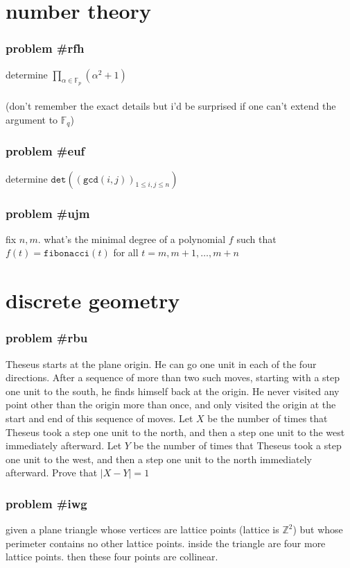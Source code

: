 \documentclass{article}
\newcommand{\problem}[1]{\subsubsection*{\textbf{problem \##1}}}
\newcommand{\chapter}[1]{\section*{#1}}
\newcommand{\Z}{\mathbb{Z}}
\newcommand{\F}{\mathbb{F}}
\newcommand{\FNC}[1]{\texttt{#1}}
\begin{document}
\chapter{number theory}
\problem{rfh} determine $\displaystyle{\prod_{\alpha\in\F_p}(\alpha^2+1)}$\\\\
(don't remember the exact details but i'd be surprised if one can't extend the argument to $\F_q$)
\problem{euf} determine $\FNC{det}((\FNC{gcd}(i,j))_{1\le i,j\le n})$
\problem{ujm} fix $n,m$. what's the minimal degree of a polynomial $f$ such that $f(t)=\FNC{fibonacci}(t)$ for all $t=m,m+1,\dots,m+n$
\chapter{discrete geometry}
\problem{rbu} Theseus starts at the plane origin. He can go one unit in each of the four directions. After a sequence
of more than two such moves, starting with a step one unit to the south, he finds himself back at the origin. He never visited any point other than the origin more than once, and only visited the origin at the start and end of this sequence of moves. Let $X$ be the number of times that Theseus took a step one unit to the north, and then a step one unit to the west immediately afterward. Let $Y$ be the number of times that Theseus took a step one unit to the west, and then a step one unit to the north immediately afterward. Prove that $|X-Y| = 1$
\problem{iwg} given a plane triangle whose vertices are lattice points (lattice is $\Z^2$) but whose perimeter contains no other lattice points. inside the triangle are four more lattice points. then these four points are collinear. 
\end{document}
